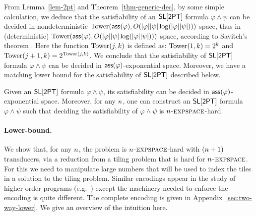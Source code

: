 From Lemma~\ref{lem-2pt} and Theorem~\ref{thm-generic-dec}, by some simple calculation, we deduce that the satisfiability of an $\textsf{SL}[\textsf{2PT}]$ formula $\varphi \wedge \psi$ can be decided in 
nondeterministic $\mathrm{Tower}(\mathsf{ass}(\varphi), O(|\varphi| |\psi| \log(|\varphi| |\psi|) ))$ space, thus in (deterministic) $\mathrm{Tower}(\mathsf{ass}(\varphi), O(|\varphi| |\psi| \log(|\varphi| |\psi|) ))$ space, according to Savitch's theorem \cite{Savitch70}. Here the function $\mathrm{Tower}(j, k)$ is %
defined as: $\mathrm{Tower}(1, k)= 2^k$ and $\mathrm{Tower}(j+1, k) = 2^{\mathrm{Tower}(j, k)}$. We conclude that the satisfiability of $\textsf{SL}[\textsf{2PT}]$ formula $\varphi \wedge \psi$ can be decided in $\mathsf{ass}(\varphi)$-exponential space.
Moreover, we have a matching lower bound for the satisfiability of $\textsf{SL}[\textsf{2PT}]$ described below.
%
\begin{theorem}
Given an $\textsf{SL}[\textsf{2PT}]$ formula $\varphi \wedge \psi$, its satisfiability can be decided in $\mathsf{ass}(\varphi)$-exponential space. Moreover,  for any $n$, one can construct an  $\textsf{SL}[\textsf{2PT}]$ formula $\varphi \wedge \psi$ such that deciding the satisfiability of $\varphi \wedge \psi$  %
is $n$-$\textsc{expspace}$-hard.
\end{theorem}

\paragraph{Lower-bound.}

We show that, for any $n$, the problem is $n$-$\textsc{expspace}$-hard with $(n+1)$ transducers, via a reduction from a tiling problem that is hard for $n$-$\textsc{expspace}$.
For this we need to manipulate large numbers that will be used to index the tiles in a solution to the tiling problem.
Similar encodings appear in the study of higher-order programs (e.g.~\cite{J01,CW07}) except the machinery needed to enforce the encoding is quite different.
The complete encoding is given in 
          {Appendix~\ref{sec:two-way-lower}}.
We give an overview of the intuition here.

